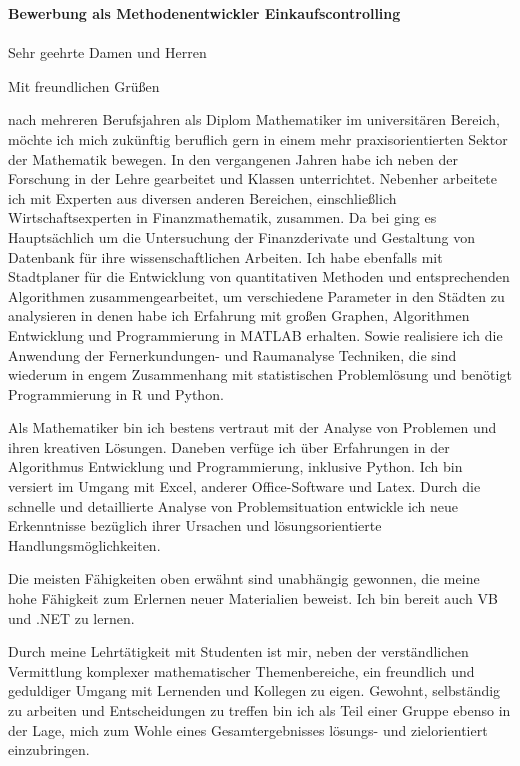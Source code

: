 \documentclass[11pt,a4paper,sans]{moderncv}        %
\title{}                               %
\begin{document}
\date{Februar 12, 2016}
\opening{\textbf{Bewerbung als Methodenentwickler Einkaufscontrolling}\\ ~~ \\ Sehr geehrte Damen und Herren}
\closing{Mit freundlichen Grüßen}
\enclosure[Anhang]{}          %
\makelettertitle
nach mehreren Berufsjahren als Diplom Mathematiker im universitären Bereich, möchte ich mich zukünftig beruflich gern in einem mehr praxisorientierten Sektor der Mathematik  bewegen. In den vergangenen Jahren habe ich neben der Forschung in der Lehre gearbeitet und  Klassen unterrichtet. Nebenher arbeitete ich mit Experten aus diversen anderen Bereichen, einschließlich  Wirtschaftsexperten in Finanzmathematik, zusammen. Da bei ging es Hauptsächlich um die Untersuchung der Finanzderivate  und Gestaltung von Datenbank für ihre wissenschaftlichen Arbeiten. Ich habe ebenfalls mit Stadtplaner für die Entwicklung von quantitativen Methoden und entsprechenden Algorithmen zusammengearbeitet, um verschiedene Parameter in den Städten zu analysieren in denen habe ich Erfahrung mit großen Graphen, Algorithmen Entwicklung und Programmierung in MATLAB erhalten.  Sowie realisiere ich die Anwendung der Fernerkundungen- und Raumanalyse Techniken, die sind wiederum in engem Zusammenhang mit statistischen Problemlösung und benötigt Programmierung in R und Python.

Als Mathematiker bin ich bestens vertraut mit der  Analyse von Problemen und ihren kreativen Lösungen. Daneben verfüge ich über Erfahrungen in der Algorithmus Entwicklung und Programmierung, inklusive Python. Ich bin versiert im Umgang mit Excel, anderer Office-Software und  Latex. Durch die schnelle und detaillierte Analyse von Problemsituation entwickle ich neue Erkenntnisse bezüglich ihrer Ursachen und lösungsorientierte Handlungsmöglichkeiten. 

Die meisten Fähigkeiten oben erwähnt sind unabhängig gewonnen, die meine hohe Fähigkeit zum Erlernen neuer Materialien beweist. Ich bin  bereit auch VB und .NET zu lernen. 

Durch meine Lehrtätigkeit mit Studenten ist mir, neben der verständlichen Vermittlung komplexer mathematischer Themenbereiche, ein freundlich und geduldiger Umgang mit Lernenden und Kollegen zu eigen.  
 Gewohnt, selbständig zu arbeiten und Entscheidungen zu treffen bin ich als  Teil einer Gruppe ebenso in der Lage, mich zum Wohle eines Gesamtergebnisses lösungs- und zielorientiert einzubringen.
\end{document}
